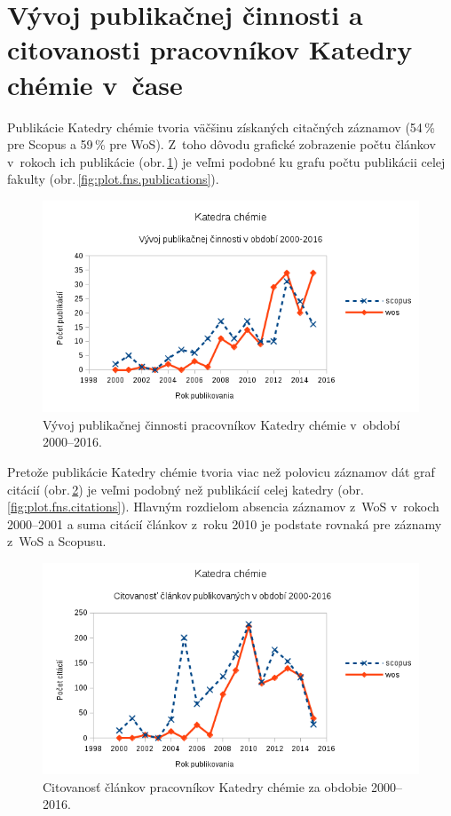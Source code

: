 \section{Vývoj publikačnej činnosti a citovanosti pracovníkov Katedry chémie
v~čase}

Publikácie Katedry chémie tvoria väčšinu získaných citačných záznamov (54\,\%
pre Scopus a 59\,\% pre WoS).  Z~toho dôvodu grafické zobrazenie počtu článkov
v~rokoch ich publikácie (obr.\,\ref{fig:plot.chem.publications}) je veľmi podobné
ku grafu počtu publikácii celej fakulty (obr.\,\ref{fig:plot.fns.publications}).

\begin{figure}
  \centering
  \includegraphics[width=\textwidth]{obr/plot-chem-publications.png}
  \caption{Vývoj publikačnej činnosti pracovníkov Katedry chémie v~období 2000--2016.}
  \label{fig:plot.chem.publications}
\end{figure}

Pretože publikácie Katedry chémie tvoria viac než polovicu záznamov dát graf
citácií (obr.\,\ref{fig:plot.chem.citations}) je veľmi podobný než publikácií
celej katedry (obr.\,\ref{fig:plot.fns.citations}).  Hlavným rozdielom absencia
záznamov z~WoS v~rokoch 2000--2001 a suma citácií článkov z~roku 2010 je
podstate rovnaká pre záznamy z~WoS a Scopusu.

\begin{figure}
  \centering
  \includegraphics[width=\textwidth]{obr/plot-chem-citations.png}
  \caption{Citovanosť článkov pracovníkov Katedry chémie za obdobie 2000--2016.}
  \label{fig:plot.chem.citations}
\end{figure}


